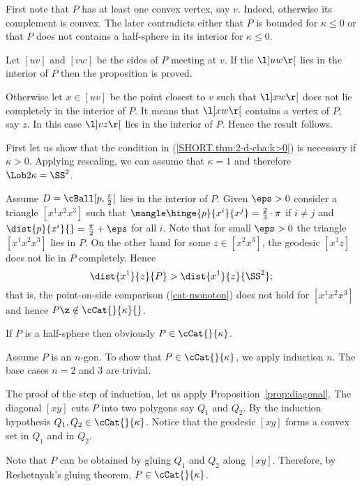 First note that $P$ has at least one convex vertex, say $v$.
Indeed, otherwise its complement is convex.
The later contradicts either
that $P$ is bounded for $\kappa\le  0$ 
or that $P$ does not contains a half-sphere in its interior for $\kappa\le  0$.

Let $[uv]$ and $[vw]$ be the sides of $P$ meeting at $v$.
If the $\l]uw\r[$ lies in the interior of $P$ 
then the proposition is proved.


Otherwise let $x\in[uv]$ be the point closest to $v$
such that $\l]xw\r[$ does not lie completely in the interior of $P$.
It means that $\l]xw\r[$ contains a vertex of $P$, 
say $z$.
In this case $\l]vz\r[$ lies in the interior of $P$.
Hence the result follows.
\qeds


First let us show that the condition in (\ref{SHORT.thm:2-d-cba:k>0}) is necessary if $\kappa>0$. 
Applying rescaling, we can assume that $\kappa=1$ and therefore $\Lob2\kappa=\SS^2$.

Assume $D=\cBall[p,\tfrac{\pi}2]$ lies in  the interior of $P$.
Given $\eps>0$
consider a triangle $[x^1x^2x^3]$ 
such that $\mangle\hinge{p}{x^i}{x^j}=\tfrac23\cdot\pi$ if $i\ne j$
and 
$\dist{p}{x^i}{}=\tfrac{\pi}2+\eps$ for all $i$.
Note that for small $\eps>0$ the triangle $ [x^1x^2x^3]$ lies in $P$.
On the other hand for some $z\in[x^2x^3]$, the geodesic $[x^1z]$ does not lie in $P$ completely.
Hence 
\[\dist{x^1}{z}{P}>\dist{x^1}{z}{\SS^2};\]
that is, the point-on-side comparison (\ref{cat-monoton}) does not hold for $[x^1x^2x^3]$
and hence $P\z\notin \cCat{}{\kappa}{}$.

If $P$ is a half-sphere then obviously $P\in\cCat{}{\kappa}$.

Assume $P$ is an $n$-gon.
To show that $P\in\cCat{}{\kappa}$,
we apply induction $n$.
The base cases $n=2$ and $3$ are trivial.

The proof of the step of induction,
let us apply Proposition~\ref{prop:diagonal}.
The diagonal $[xy]$ cuts $P$ into two polygons say $Q_1$ and $Q_2$.
By the induction hypothesis $Q_1,Q_2\in\cCat{}{\kappa}$.
Notice that the geodesic $[xy]$ forms a convex set
in $Q_1$ and in $Q_2$.

Note that $P$ can be obtained by gluing $Q_1$ and $Q_2$ along $[xy]$.
Therefore, by Reshetnyak's gluing theorem,
$P\in\cCat{}{\kappa}$.
\qeds













